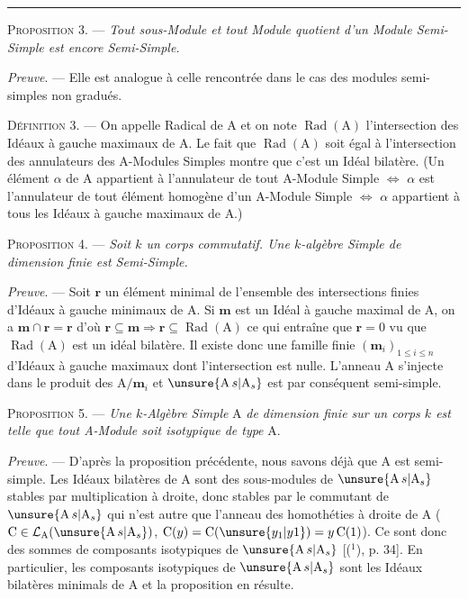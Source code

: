 \rule{\linewidth}{0.4pt}

\textsc{Proposition 3}. — \emph{Tout sous-Module et tout Module quotient d'un Module Semi-Simple
est encore Semi-Simple.}

\emph{Preuve}. — Elle est analogue à celle rencontrée dans le cas des modules semi-simples
non gradués.

\textsc{Définition 3}. — On appelle Radical de A et on note $\operatorname{Rad}(\mathrm A)$ l'intersection des Idéaux
à gauche maximaux de A. Le fait que $\operatorname{Rad}(\mathrm A)$ soit égal à l'intersection des annulateurs
des A-Modules Simples montre que c'est un Idéal bilatère. (Un élément $\alpha$ de A appartient
à l'annulateur de tout A-Module Simple $\Leftrightarrow$ $\alpha$ est l'annulateur de tout élément homogène
d'un A-Module Simple $\Leftrightarrow$ $\alpha$ appartient à tous les Idéaux à gauche maximaux de A.)

\textsc{Proposition 4}. — \emph{Soit $k$ un corps commutatif. Une $k$-algèbre Simple de dimension finie
est Semi-Simple.}

\emph{Preuve}. — Soit $\mathbf r$ un élément minimal de l'ensemble des intersections finies d'Idéaux à
gauche minimaux de A. Si $\mathbf m$ est un Idéal à gauche maximal de A, on a $\mathbf m\cap\mathbf r=\mathbf r$ d'où
$\mathbf r\subseteq\mathbf m\Rightarrow\mathbf r\subseteq\operatorname{Rad}(\mathrm A)$ ce qui entraîne que $\mathbf r=0$ vu que $\operatorname{Rad}(\mathrm A)$ est un idéal bilatère. Il
existe donc une famille finie $(\mathbf m_i)_{1\le i\le n}$ d'Idéaux à gauche maximaux dont l'intersection
est nulle. L'anneau A s'injecte dans le produit des $\mathrm A/\mathbf m_i$ et $\unsure{\mathrm A\,s|\mathrm A_s}$ est par conséquent semi-simple.

\textsc{Proposition 5}. — \emph{Une $k$-Algèbre Simple} A \emph{de dimension finie sur un corps $k$ est telle
que tout A-Module soit isotypique de type} A.

\emph{Preuve}. — D'après la proposition précédente, nous savons déjà que A est semi-simple.
Les Idéaux bilatères de A sont des sous-modules de $\unsure{\mathrm A\,s|\mathrm A_s}$ stables par multiplication à droite,
donc stables par le commutant de $\unsure{\mathrm A\,s|\mathrm A_s}$ qui n'est autre que l'anneau des homothéties à
droite de A ($\mathrm C\in\mathcal L_{\mathrm A}(\unsure{\mathrm A\,s|\mathrm A_s})$, $\mathrm C(y)=\mathrm C(\unsure{y_1|y1})=y\,\mathrm C(1)$). Ce sont donc des sommes de composants
isotypiques de $\unsure{\mathrm A\,s|\mathrm A_s}$ [(${}^1$), p. 34]. En particulier, les composants isotypiques de $\unsure{\mathrm A\,s|\mathrm A_s}$
sont les Idéaux bilatères minimals de A et la proposition en résulte.


